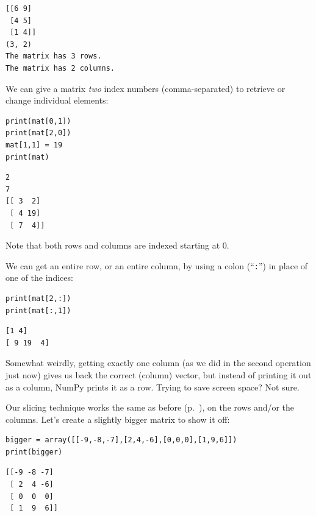 \begin{Verbatim}[fontsize=\small,samepage=true,frame=leftline,framesep=5mm,framerule=1mm]
[[6 9]
 [4 5]
 [1 4]]
(3, 2)
The matrix has 3 rows.
The matrix has 2 columns.
\end{Verbatim}


We can give a matrix \textit{two} index numbers (comma-separated) to retrieve
or change individual elements:

\begin{Verbatim}[fontsize=\small,samepage=true,frame=single,framesep=3mm]
print(mat[0,1])
print(mat[2,0])
mat[1,1] = 19
print(mat)
\end{Verbatim}
\vspace{-.2in}

\begin{Verbatim}[fontsize=\small,samepage=true,frame=leftline,framesep=5mm,framerule=1mm]
2
7
[[ 3  2]
 [ 4 19]
 [ 7  4]]
\end{Verbatim}


Note that both rows and columns are indexed starting at 0.

\medskip

We can get an entire row, or an entire column, by using a colon
(``\texttt{:}'') in place of one of the indices:

\begin{Verbatim}[fontsize=\small,samepage=true,frame=single,framesep=3mm]
print(mat[2,:])
print(mat[:,1])
\end{Verbatim}
\vspace{-.2in}

\begin{Verbatim}[fontsize=\small,samepage=true,frame=leftline,framesep=5mm,framerule=1mm]
[1 4]
[ 9 19  4]
\end{Verbatim}

Somewhat weirdly, getting exactly one column (as we did in the second operation
just now) gives us back the correct (column) vector, but instead of printing it
out as a column, NumPy prints it as a row. Trying to save screen space? Not
sure.

\medskip

Our slicing technique works the same as before (p.~\pageref{slice}), on the
rows and/or the columns. Let's create a slightly bigger matrix to show it off:

\begin{Verbatim}[fontsize=\small,samepage=true,frame=single,framesep=3mm]
bigger = array([[-9,-8,-7],[2,4,-6],[0,0,0],[1,9,6]])
print(bigger)
\end{Verbatim}
\vspace{-.2in}
\begin{Verbatim}[fontsize=\small,samepage=true,frame=leftline,framesep=5mm,framerule=1mm]
[[-9 -8 -7]
 [ 2  4 -6]
 [ 0  0  0]
 [ 1  9  6]]
\end{Verbatim}

